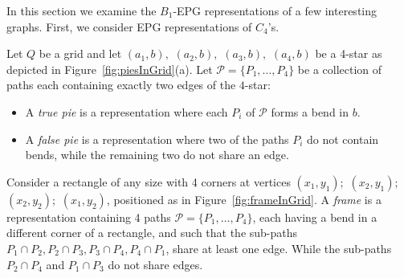 \documentclass[runningheads]{llncs}
\begin{document}
% 

In this section we examine the $B_1$-EPG representations of a few interesting graphs. First, we consider EPG representations of $C_4$'s.


\begin{definition} \label{defi:tortasFrame}

Let $ Q $ be a grid and let $ (a_1, b),$ $(a_2, b),$ $(a_3, b),$ $(a_4, b)$ be a 4-star as depicted in Figure~\ref{fig:piesInGrid}(a). Let $ \mathcal{P} = \{P_1, \dots , P_4\}$ be a collection of paths each containing exactly two edges of the $4$-star:

\begin{itemize}
\item A \emph{true pie} is a representation where each $P_i$ of $ \mathcal{P} $ forms a bend in $b$.

\item A \emph {false pie} is a representation where two of the paths $P_i$ do not contain bends, while the remaining two do not share an edge. 

\vspace{-0.5cm}

\vspace{-0.5cm}
\end{itemize}
\end{definition}

\begin{definition} \label{defi:tortasFrame2}
 Consider a rectangle of any size with 4 corners at vertices $ (x_1, y_1);$ $(x_2, y_1);$ $(x_2, y_2);$ $(x_1, y_2) $, positioned as in  Figure~\ref{fig:frameInGrid}. A \emph{frame} is a representation containing 4 paths $\mathcal{P} =  \{ P_1, \dots, P_4\} $, each having a bend in a different corner of a rectangle, and such that the  sub-paths $ P_1 \cap P_2, P_2 \cap P_3, P_3 \cap P_4, P_4 \cap P_1 $, share at least one edge. While the sub-paths $ P_2 \cap P_4 $ and $ P_1 \cap P_3 $ do not share edges.



\end{definition}
\end{document}
